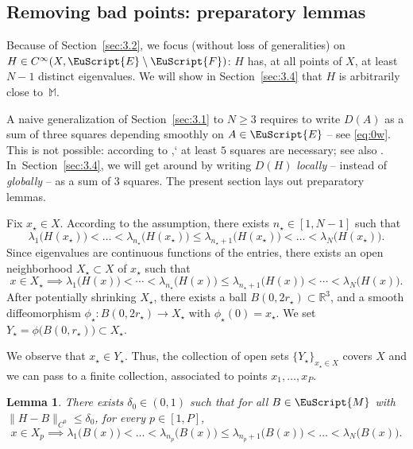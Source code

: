 \documentclass[JEP,XML,SOM,Unicode,NoFloatCountersInSection]{cedram}
\let\pazocal\EuScript
\newtheorem{lem}{Lemma}[section]
\theoremstyle{definition}
\newcommand{\FF}{\pazocal{F}}
\newcommand{\EE}{\pazocal{E}}
\newcommand{\MM}{\pazocal{M}}
\newcommand{\R}{\mathbb{R}}
\newcommand{\Mm}{\mathbb{M}}
\begin{document}
\subsection{Removing bad points: preparatory lemmas}\label{sec:3.3} Because of Section~\ref{sec:3.2}, we focus (without loss of generalities) on $H \in C^\infty(X, \EE\setminus \FF)$: $H$ has, at all points of $X$, at least $N-1$ distinct eigenvalues. We will show in Section~\ref{sec:3.4} that $H$ is arbitrarily close to~$\Mm$.

A naive generalization of Section~\ref{sec:3.1} to $N \geq 3$ requires to write $D(A)$ as a sum of three squares depending smoothly on $A \in \EE$ -- see \eqref{eq:0w}. This is not possible: according to \cite{D11},` at least $5$ squares are necessary; see also \cite{I92,L98,P02,D11}. In~Section~\ref{sec:3.4}, we will get around by writing $D(H)$ \textit{locally} -- instead of \textit{globally} -- as a sum of $3$ squares. The present section lays out preparatory lemmas.

Fix $x_\star \in X$. According to the assumption, there exists $n_\star \in [1,N-1]$ such that
\begin{equation*}
\lambda_1\bigl( H(x_\star) \bigr) < \dots < \lambda_{n_\star}\bigl( H(x_\star) \bigr) \leq \lambda_{n_\star+1}\bigl( H(x_\star) \bigr) < \dots < \lambda_N\bigl( H(x_\star) \bigr).
\end{equation*}
Since eigenvalues are continuous functions of the entries, there exists an open neighborhood $X_\star \subset X$ of $x_\star$ such that
\begin{equation}\label{eq:2c}
x \in X_\star \implies
\lambda_1\bigl( H(x) \bigr) \!<\! \cdots \!<\! \lambda_{n_\star}\bigl( H(x) \bigr) \!\leq\! \lambda_{n_\star+1}\bigl( H(x) \bigr) \!<\! \cdots \!<\! \lambda_N\bigl( H(x) \bigr).
\end{equation}
After potentially shrinking $X_\star$, there exists a ball $B(0,2r_\star) \subset \R^3$, and a smooth diffeomorphism $\phi_\star : B(0,2r_\star) \to X_\star$ with $\phi_\star(0) = x_\star$. We set $Y_\star = \phi\bigl(B(0,r_\star)\bigr) \subset X_\star$.

We observe that $x_\star \in Y_\star$. Thus, the collection of open sets $\{ Y_\star \}_{x_\star \in X}$ covers $X$ and we can pass to a finite collection, associated to points $x_1, \dots, x_P$.

\begin{lem}\label{lem:1b} There exists $\delta_0 \in (0,1)$ such that for all $B \in \MM$ with $\| H-B\|_{C^0} \leq \delta_0$, for every $p \in [1,P]$,
\begin{equation*}
x \in X_p \implies
\lambda_1\bigl( B(x) \bigr) < \dots < \lambda_{n_p}\bigl( B(x) \bigr) \leq \lambda_{n_p+1}\bigl( B(x) \bigr) < \dots < \lambda_N\bigl( B(x) \bigr).
\end{equation*}
\end{lem}
\end{document}
